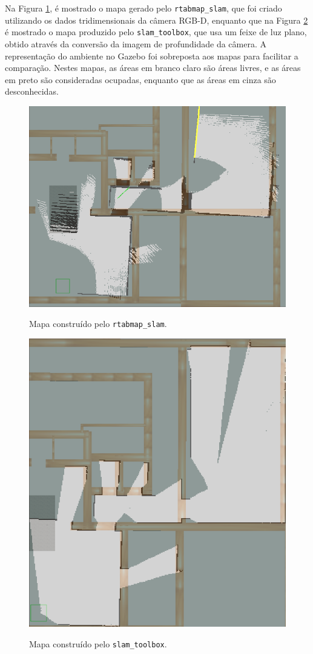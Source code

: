 \documentclass[repeatfields,xlists,xpacks,oneside,yearsonly]{ufrgscca}
\begin{document}
Na Figura \ref{fig:mapping_rtabmap}, é mostrado o mapa gerado pelo
\texttt{rtabmap\_slam}, que foi criado utilizando os dados
tridimensionais da câmera RGB-D, enquanto que na Figura
\ref{fig:mapping_slam_toolbox} é mostrado o mapa produzido pelo
\texttt{slam\_toolbox}, que usa um feixe de luz plano, obtido através
da conversão da imagem de profundidade da câmera. A representação do
ambiente no Gazebo foi sobreposta aos mapas para facilitar a
comparação. Nestes mapas, as áreas em branco claro são áreas livres,
e as áreas em preto são consideradas ocupadas, enquanto que as áreas
em cinza são desconhecidas.

\begin{figure}[H]
    {
        \centering
        \caption{Mapa construído pelo \texttt{rtabmap\_slam}.}
        \label{fig:mapping_rtabmap}
        \includegraphics[width=0.8\linewidth]{rtabmap_slam_map-compared.png}\\
    }
\end{figure}

\begin{figure}[H]
    {
        \centering
        \caption{Mapa construído pelo \texttt{slam\_toolbox}.}
        \label{fig:mapping_slam_toolbox}
        \includegraphics[width=0.6\linewidth]{slam_toolbox_map-compared.png}\\
    }
\end{figure}
\end{document}
